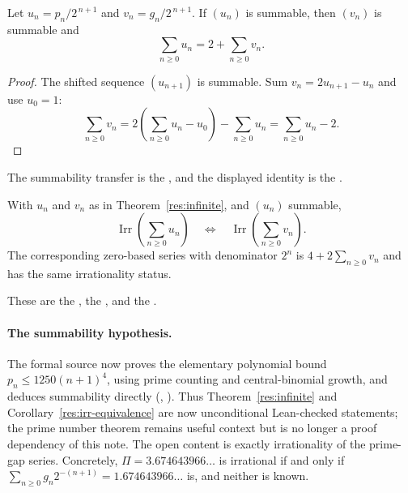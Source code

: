 \documentclass[11pt]{article}
\begin{document}
\begin{theorem}\label{res:infinite}
Let $u_n=p_n/2^{\,n+1}$ and $v_n=g_n/2^{\,n+1}$.  If $(u_n)$ is summable, then
$(v_n)$ is summable and
\[
 \sum_{n\ge0}u_n=2+\sum_{n\ge0}v_n .
\]
\end{theorem}

\begin{proof}
The shifted sequence $(u_{n+1})$ is summable.  Sum
$v_n=2u_{n+1}-u_n$ and use $u_0=1$:
\[
 \sum_{n\ge0}v_n
 =2\left(\sum_{n\ge0}u_n-u_0\right)-\sum_{n\ge0}u_n
 =\sum_{n\ge0}u_n-2 .
\]
\end{proof}

\noindent The summability transfer is the
, and the displayed identity is the
.

\begin{corollary}\label{res:irr-equivalence}
With $u_n$ and $v_n$ as in Theorem~\ref{res:infinite}, and $(u_n)$ summable,
\[
 \operatorname{Irr}\!\left(\sum_{n\ge0}u_n\right)
 \quad\Longleftrightarrow\quad
 \operatorname{Irr}\!\left(\sum_{n\ge0}v_n\right).
\]
The corresponding zero-based series with denominator $2^n$ is
$4+2\sum_{n\ge0}v_n$ and has the same irrationality status.
\end{corollary}

\noindent These are the
, the
, and the
.

\paragraph{The summability hypothesis.}
The formal source now proves the elementary polynomial bound
$p_n\le1250(n+1)^4$, using prime counting and central-binomial growth, and
deduces summability directly
(,
).
Thus Theorem~\ref{res:infinite} and Corollary~\ref{res:irr-equivalence} are now
unconditional Lean-checked statements; the prime number theorem remains useful
context but is no longer a proof dependency of this note.  The open content is
exactly irrationality of the prime-gap series.  Concretely,
$\Pi=3.674643966\ldots$ is irrational if and only if
$\sum_{n\ge0}g_n2^{-(n+1)}=1.674643966\ldots$ is, and neither is known.
\end{document}
